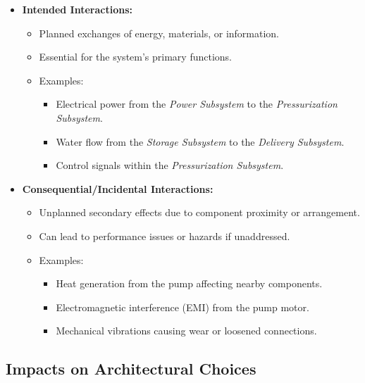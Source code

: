 \documentclass[12pt]{article}
\begin{document}
\begin{itemize}
    \item \textbf{Intended Interactions:}
    \begin{itemize}
        \item Planned exchanges of energy, materials, or information.
        \item Essential for the system's primary functions.
        \item Examples:
        \begin{itemize}
            \item Electrical power from the \textit{Power Subsystem} to the \textit{Pressurization Subsystem}.
            \item Water flow from the \textit{Storage Subsystem} to the \textit{Delivery Subsystem}.
            \item Control signals within the \textit{Pressurization Subsystem}.
        \end{itemize}
    \end{itemize}
    \item \textbf{Consequential/Incidental Interactions:}
    \begin{itemize}
        \item Unplanned secondary effects due to component proximity or arrangement.
        \item Can lead to performance issues or hazards if unaddressed.
        \item Examples:
        \begin{itemize}
            \item Heat generation from the pump affecting nearby components.
            \item Electromagnetic interference (EMI) from the pump motor.
            \item Mechanical vibrations causing wear or loosened connections.
        \end{itemize}
    \end{itemize}
\end{itemize}

\subsection{Impacts on Architectural Choices}
\end{document}
